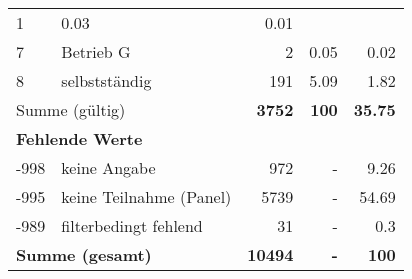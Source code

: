 \begin{longtable}{lXrrr}
       \num{1} &
       \num[round-mode=places,round-precision=2]{0,03} &
         \num[round-mode=places,round-precision=2]{0,01} \\

     7 &
     \multicolumn{1}{X}{ Betrieb G   } &


       \num{2} &
       \num[round-mode=places,round-precision=2]{0,05} &
         \num[round-mode=places,round-precision=2]{0,02} \\

     8 &
     \multicolumn{1}{X}{ selbstständig   } &


       \num{191} &
       \num[round-mode=places,round-precision=2]{5,09} &
         \num[round-mode=places,round-precision=2]{1,82} \\
     \midrule
     \multicolumn{2}{l}{Summe (gültig)} &
       \textbf{\num{3752}} &
     \textbf{100} &
       \textbf{\num[round-mode=places,round-precision=2]{35,75}} \\
     \multicolumn{5}{l}{\textbf{Fehlende Werte}}\\
       -998 &
       keine Angabe &
         \num{972} &
        - &
         \num[round-mode=places,round-precision=2]{9,26} \\
       -995 &
       keine Teilnahme (Panel) &
         \num{5739} &
        - &
         \num[round-mode=places,round-precision=2]{54,69} \\
       -989 &
       filterbedingt fehlend &
         \num{31} &
        - &
         \num[round-mode=places,round-precision=2]{0,3} \\
     \midrule
     \multicolumn{2}{l}{\textbf{Summe (gesamt)}} &
          \textbf{\num{10494}} &
        \textbf{-} &
        \textbf{100} \\
     \bottomrule
     \end{longtable}
     

